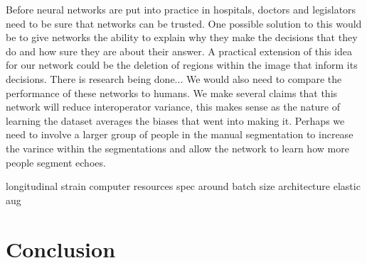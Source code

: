 \documentclass[12pt]{article}
\begin{document}
Before neural networks are put into practice in hospitals, doctors and legislators need to be sure that networks can be trusted.
One possible solution to this would be to give networks the ability to explain why they make the decisions that they do and how sure they are about their answer.
A practical extension of this idea for our network could be the deletion of regions within the image that inform its decisions.
There is research being done...
We would also need to compare the performance of these networks to humans.
We make several claims that this network will reduce interoperator variance, this makes sense as the nature of learning the dataset averages the biases that went into making it.
Perhaps we need to involve a larger group of people in the manual segmentation to increase the varince within the segmentations and allow the network to learn how more people segment echoes.


longitudinal strain
computer resources
spec around batch size
architecture
elastic aug
\section{Conclusion}



%
\end{document}
